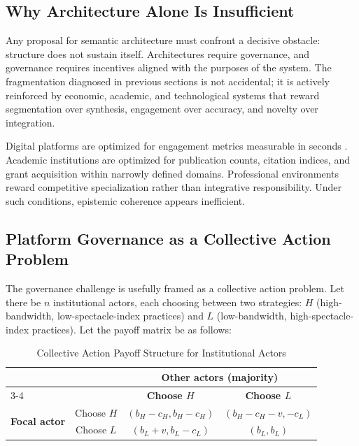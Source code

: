 \documentclass[12pt]{article}
\theoremstyle{definition}
\theoremstyle{plain}
\begin{document}
\subsection{Why Architecture Alone Is Insufficient}

Any proposal for semantic architecture must confront a decisive obstacle: structure does not sustain itself. Architectures require governance, and governance requires incentives aligned with the purposes of the system. The fragmentation diagnosed in previous sections is not accidental; it is actively reinforced by economic, academic, and technological systems that reward segmentation over synthesis, engagement over accuracy, and novelty over integration.

Digital platforms are optimized for engagement metrics measurable in seconds \citep{Zuboff2019}. Academic institutions are optimized for publication counts, citation indices, and grant acquisition within narrowly defined domains. Professional environments reward competitive specialization rather than integrative responsibility. Under such conditions, epistemic coherence appears inefficient.

\subsection{Platform Governance as a Collective Action Problem}

The governance challenge is usefully framed as a collective action problem. Let there be $n$ institutional actors, each choosing between two strategies: $H$ (high-bandwidth, low-spectacle-index practices) and $L$ (low-bandwidth, high-spectacle-index practices). Let the payoff matrix be as follows:

\begin{table}[h!]
\centering
\caption{Collective Action Payoff Structure for Institutional Actors}
\label{tab:game}
\renewcommand{\arraystretch}{1.4}
\begin{tabular}{lccc}
\toprule
& & \multicolumn{2}{c}{\textbf{Other actors (majority)}} \\
\cmidrule(lr){3-4}
& & \textbf{Choose $H$} & \textbf{Choose $L$} \\
\midrule
\multirow{2}{*}{\textbf{Focal actor}} & Choose $H$ & $(b_H - c_H, b_H - c_H)$ & $(b_H - c_H - v, -c_L)$ \\
& Choose $L$ & $(b_L + v, b_L - c_L)$ & $(b_L, b_L)$ \\
\bottomrule
\end{tabular}
\end{table}
\end{document}
